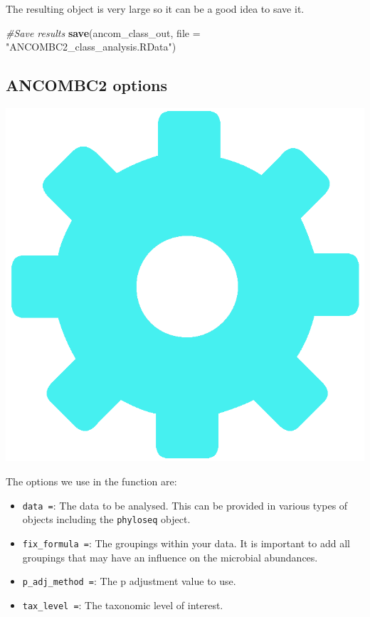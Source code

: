 \documentclass[
]{book}
\newenvironment{Shaded}{\begin{snugshade}}{\end{snugshade}}
\newcommand{\AttributeTok}[1]{\textcolor[rgb]{0.13,0.29,0.53}{#1}}
\newcommand{\CommentTok}[1]{\textcolor[rgb]{0.56,0.35,0.01}{\textit{#1}}}
\newcommand{\FunctionTok}[1]{\textcolor[rgb]{0.13,0.29,0.53}{\textbf{#1}}}
\newcommand{\NormalTok}[1]{#1}
\newcommand{\StringTok}[1]{\textcolor[rgb]{0.31,0.60,0.02}{#1}}
\providecommand{\tightlist}{%
  \setlength{\itemsep}{0pt}\setlength{\parskip}{0pt}}
\begin{document}
The resulting object is very large so it can be a good idea to save it.

\begin{Shaded}
\begin{Highlighting}[]
\CommentTok{\#Save results}
\FunctionTok{save}\NormalTok{(ancom\_class\_out, }\AttributeTok{file =} \StringTok{"ANCOMBC2\_class\_analysis.RData"}\NormalTok{)}
\end{Highlighting}
\end{Shaded}

\hypertarget{ancombc2-options}{%
\subsection{ANCOMBC2 options}\label{ancombc2-options}}

\includegraphics{figures/parameter_blue.png}

The options we use in the function are:

\begin{itemize}
\tightlist
\item
  \texttt{data\ =}: The data to be analysed. This can be provided in various types of objects including the \texttt{phyloseq} object.
\item
  \texttt{fix\_formula\ =}: The groupings within your data. It is important to add all groupings that may have an influence on the microbial abundances.
\item
  \texttt{p\_adj\_method\ =}: The p adjustment value to use.
\item
  \texttt{tax\_level\ =}: The taxonomic level of interest.
\end{itemize}
\end{document}
